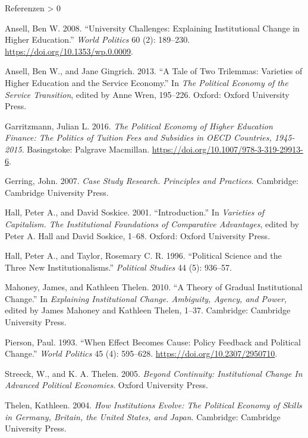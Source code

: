\documentclass[
  ignorenonframetext,
]{beamer}
\newlength{\cslhangindent}
\newenvironment{CSLReferences}[2] %
 {%
  \setlength{\parindent}{0pt}
  \ifodd #1 \everypar{\setlength{\hangindent}{\cslhangindent}}\ignorespaces\fi
  \ifnum #2 > 0
  \setlength{\parskip}{#2\baselineskip}
  \fi
 }%
 {}
\begin{document}
\begin{frame}[allowframebreaks]{Referenzen}
\protect\hypertarget{referenzen}{}
\hypertarget{refs}{}
\begin{CSLReferences}{1}{0}
\leavevmode\hypertarget{ref-Ansell.2008b}{}%
Ansell, Ben W. 2008. {``{University Challenges: Explaining Institutional
Change in Higher Education}.''} \emph{World Politics} 60 (2): 189--230.
\url{https://doi.org/10.1353/wp.0.0009}.

\leavevmode\hypertarget{ref-Ansell.2013}{}%
Ansell, Ben W., and Jane Gingrich. 2013. {``{A Tale of Two Trilemmas:
Varieties of Higher Education and the Service Economy}.''} In \emph{{The
Political Economy of the Service Transition}}, edited by Anne Wren,
195--226. Oxford: {Oxford University Press}.

\leavevmode\hypertarget{ref-garritzmann2016}{}%
Garritzmann, Julian L. 2016. \emph{{The Political Economy of Higher
Education Finance: The Politics of Tuition Fees and Subsidies in OECD
Countries, 1945-2015}}. Basingstoke: Palgrave Macmillan.
\url{https://doi.org/10.1007/978-3-319-29913-6}.

\leavevmode\hypertarget{ref-Gerring.2007}{}%
Gerring, John. 2007. \emph{{Case Study Research. Principles and
Practices}}. Cambridge: {Cambridge University Press}.

\leavevmode\hypertarget{ref-Hall.2001}{}%
Hall, Peter A., and David Soskice. 2001. {``Introduction.''} In
\emph{{Varieties of Capitalism. The Institutional Foundations of
Comparative Advantages}}, edited by Peter A. Hall and David Soskice,
1--68. Oxford: {Oxford University Press}.

\leavevmode\hypertarget{ref-Hall.1996}{}%
Hall, Peter A., and Taylor, Rosemary C. R. 1996. {``Political Science
and the Three New Institutionalisms.''} \emph{Political Studies} 44 (5):
936--57.

\leavevmode\hypertarget{ref-Mahoney.2010b}{}%
Mahoney, James, and Kathleen Thelen. 2010. {``{A Theory of Gradual
Institutional Change}.''} In \emph{{Explaining Institutional Change.
Ambiguity, Agency, and Power}}, edited by James Mahoney and Kathleen
Thelen, 1--37. Cambridge: {Cambridge University Press}.

\leavevmode\hypertarget{ref-Pierson.1993}{}%
Pierson, Paul. 1993. {``{When Effect Becomes Cause: Policy Feedback and
Political Change}.''} \emph{World Politics} 45 (4): 595--628.
\url{https://doi.org/10.2307/2950710}.

\leavevmode\hypertarget{ref-Streeck.2005}{}%
Streeck, W., and K. A. Thelen. 2005. \emph{{Beyond Continuity:
Institutional Change In Advanced Political Economies}}. {Oxford
University Press}.

\leavevmode\hypertarget{ref-Thelen.2004}{}%
Thelen, Kathleen. 2004. \emph{{How Institutions Evolve: The Political
Economy of Skills in Germany, Britain, the United States, and Japan}}.
Cambridge: {Cambridge University Press}.

\end{CSLReferences}
\end{frame}
\end{document}
